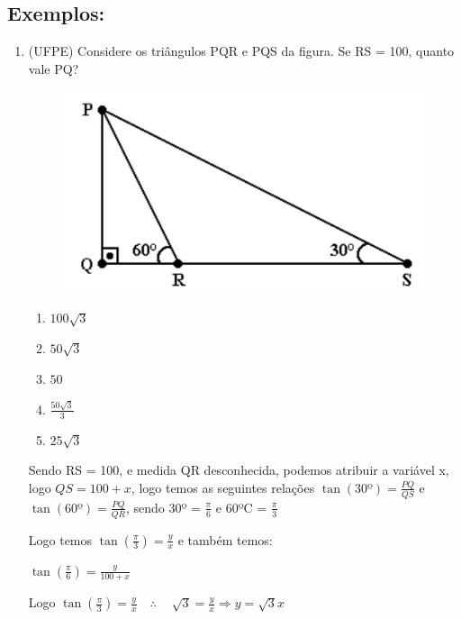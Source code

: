 \begin{multicols*}{2}
    \subsection{Exemplos:}
    \begin{enumerate}
        \item(UFPE) Considere os triângulos PQR e PQS da figura. Se RS = 100, quanto vale PQ?

              \begin{figure}[H]
                  \centering
                  \includegraphics[scale=0.38]{assets/rafael/img39.png}
              \end{figure}
              \begin{enumerate}
                  \item $100 \sqrt{3}$
                  \item $50 \sqrt{3} $
                  \item $ 50$
                  \item $\frac{50 \sqrt{3}}{3}$
                  \item $25 \sqrt{3}$
              \end{enumerate}
              Sendo RS = 100, e medida QR desconhecida, podemos atribuir a variável x, logo $QS = 100 + x$, logo temos as seguintes relações $\tan(30º) = \frac{PQ}{QS}$ e $\tan(60º) = \frac{PQ}{QR}$, sendo 30º = $\frac{\pi}{6}$ e 60ºC = $\frac{\pi}{3}$

              Logo temos $\tan \left( \frac{\pi}{3} \right) = \frac{y}{x}$ e também temos:

              $\tan \left( \frac{\pi}{6} \right) = \frac{y}{100 +x}$

              Logo $\tan \left( \frac{\pi}{3} \right) = \frac{y}{x} \quad \therefore \quad\ \sqrt{3} = \frac{y}{x} \Rightarrow y = \sqrt{3}x$


\end{enumerate}
\end{multicols*}
